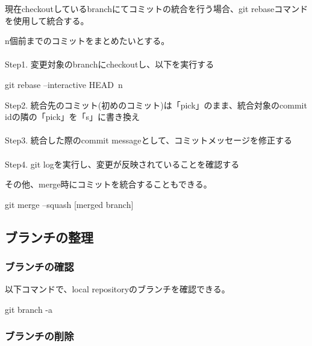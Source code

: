 \documentclass[10pt,a4j,openany,dvipdfmx]{jsarticle}
\begin{document}
現在checkoutしているbranchにてコミットの統合を行う場合、git rebaseコマンドを使用して統合する。

\begin{tcolorbox}[skin=enhanced,
left=3mm,right=3mm,top=1mm,bottom=1mm, boxrule=1.0mm, 
title=rebaseを使用したコミットの統合, coltitle=black, fonttitle=\bfseries, 
colback=SpringGreen!5!white,colframe=SpringGreen!70]
n個前までのコミットをまとめたいとする。\\
\\
Step1. 変更対象のbranchにcheckoutし、以下を実行する
\begin{commandshell}
git rebase --interactive HEAD~n
\end{commandshell}

Step2. 統合先のコミット(初めのコミット)は「pick」のまま、統合対象のcommit idの隣の「pick」を「s」に書き換え\\
\\
Step3. 統合した際のcommit messageとして、コミットメッセージを修正する\\
\\
Step4. git logを実行し、変更が反映されていることを確認する
\end{tcolorbox}

その他、merge時にコミットを統合することもできる。
\begin{commandshell}
git merge --squash [merged branch]
\end{commandshell}




\subsection{ブランチの整理} %
\label{sub:ブランチの整理}

\subsubsection{ブランチの確認} %
\label{ssub:ブランチの確認}

以下コマンドで、local repositoryのブランチを確認できる。
\begin{commandshell}
git branch -a
\end{commandshell}


\subsubsection{ブランチの削除} %
\label{ssub:ブランチの削除}
\end{document}
